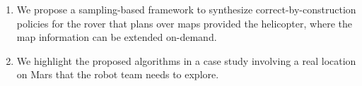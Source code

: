 \documentclass[conference]{IEEEtran}
\begin{document}
\begin{enumerate}
	\item We propose a sampling-based framework to synthesize 
	correct-by-construction policies for the rover that plans over maps provided
	the helicopter, where the map information can be extended on-demand.
	
	\item We highlight the proposed algorithms in a case study involving
	a real location on Mars that the robot team needs to explore.
	
	
	
	
	
	\end{enumerate}
	
\end{document}
